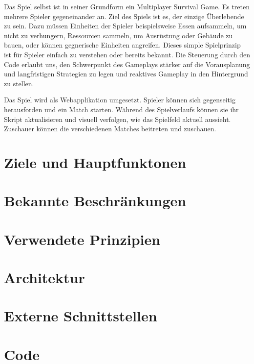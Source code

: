 \documentclass[a4paper, 11pt]{scrartcl}
\let\oldsection\section
\renewcommand\section{\clearpage\oldsection}
\begin{document}
Das Spiel selbst ist in seiner Grundform ein Multiplayer Survival Game. Es treten mehrere Spieler gegeneinander an. Ziel des Spiels ist es, der einzige Überlebende zu sein. Dazu müssen  Einheiten der Spieler beispielsweise Essen aufsammeln, um nicht zu verhungern, Ressourcen sammeln, um Ausrüstung oder Gebäude zu bauen, oder können gegnerische Einheiten angreifen. Dieses simple Spielprinzip ist für Spieler einfach zu verstehen oder bereits bekannt. Die Steuerung durch den Code erlaubt uns, den Schwerpunkt des Gameplays stärker auf die Vorausplanung und langfristigen Strategien zu legen und reaktives Gameplay in den Hintergrund zu stellen.

Das Spiel wird als Webapplikation umgesetzt. Spieler können sich gegenseitig herausforden und ein Match starten. Während des Spielverlaufs können sie ihr Skript aktualisieren und visuell verfolgen, wie das Spielfeld aktuell aussieht. Zuschauer können die verschiedenen Matches beitreten und zuschauen.

\section{Ziele und Hauptfunktonen}

\section{Bekannte Beschränkungen}

\section{Verwendete Prinzipien}

\section{Architektur}

\section{Externe Schnittstellen}

\section{Code}
\end{document}
